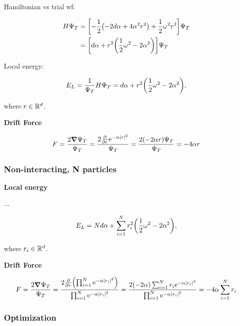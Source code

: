 Hamiltonian vs trial wf: 

\begin{align*}
    H \Psi_T &= \qty[ - \frac{1}{2} \qty(-2d \alpha + 4 \alpha^2 r^2) + \frac{1}{2} \omega^2 r^2] \Psi_T
    \\
    &= \qty[ d \alpha + r^2 \qty(\frac{1}{2} \omega^2 - 2 \alpha^2) ] \Psi_T
\end{align*}

Local energy: 

\begin{equation*}
    E_L = \frac{1}{\Psi_T} H \Psi_T = d \alpha + r^2 \qty(\frac{1}{2} \omega^2 - 2 \alpha^2),
\end{equation*}

where $r \in \mathbb{R}^d$.

\textbf{Drift Force}

\begin{equation*}
    F = \frac{2 \grad \Psi_T}{\Psi_T} = \frac{2 \pdv{r} \mathrm{e}^{-\alpha \abs{r}^2}}{\Psi_T} = \frac{2 \qty(-2 \alpha r) \Psi_T}{\Psi_T} = - 4 \alpha r
\end{equation*}

\subsubsection*{Non-interacting,  N particles}

\textbf{Local energy}

... 

\begin{equation*}
    E_L = N d \alpha + \sum_{i=1}^N r_i^2 \qty(\frac{1}{2} \omega^2 - 2 \alpha^2),
\end{equation*}

where $r_i \in \mathbb{R}^d$.

\textbf{Drift Force}

\begin{equation*}
    F = \frac{2 \grad \Psi_T}{\Psi_T} = \frac{2 \pdv{r} \qty( \prod_{i=1}^N \mathrm{e}^{-\alpha \abs{r_i}^2})}{\prod_{i=1}^N \mathrm{e}^{-\alpha \abs{r_i}^2}} = \frac{2 (-2 \alpha) \sum_{i=1}^N r_i \mathrm{e}^{-\alpha \abs{r_i}^2}}{\prod_{i=1}^N \mathrm{e}^{-\alpha \abs{r_i}^2}} = - 4 \alpha \sum_{i=1}^N r_i
\end{equation*}


\subsubsection*{Optimization}

